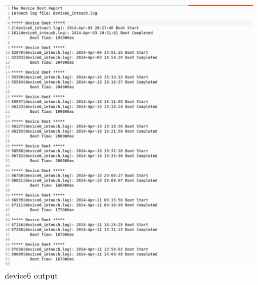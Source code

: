 \begin{figure}[h]
   \centering
    \includegraphics[width=1\textwidth]{ps7/d6.png}
    \caption{device6 output}
    \label{fig:ps7d6}
\end{figure}

\newpage
